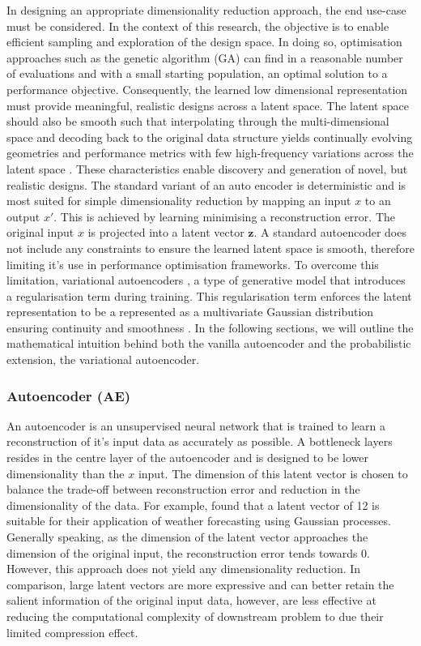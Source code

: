 \documentclass{article}
\begin{document}
In designing an appropriate dimensionality reduction approach, the end use-case must be considered. In the context of this research, the objective is to enable efficient sampling and exploration of the design space. In doing so, optimisation approaches such as the genetic algorithm (GA) can find in a reasonable number of evaluations and with a small starting population, an optimal solution to a performance objective. Consequently, the learned low dimensional representation must provide meaningful, realistic designs across a latent space. The latent space should also be smooth such that interpolating through the multi-dimensional space and decoding back to the original data structure yields continually evolving geometries and performance metrics with few high-frequency variations across the latent space \citep{Danhaive2022}. These characteristics enable discovery and generation of novel, but realistic designs. The standard variant of an auto encoder is deterministic and is most suited for simple dimensionality reduction by mapping an input $x$ to an output $x'$. This is achieved by learning minimising a reconstruction error. The original input $x$ is projected into a latent vector $\textbf{z}$. A standard autoencoder does not include any constraints to ensure the learned latent space is smooth, therefore limiting it's use in performance optimisation frameworks. To overcome this limitation, variational autoencoders \citep{Kingma2013}, a type of generative model \citep{Danhaive2022} that introduces a regularisation term during training. This regularisation term enforces the latent representation to be a represented as a multivariate Gaussian distribution ensuring continuity and smoothness \citep{Huang2022}. In the following sections, we will outline the mathematical intuition behind both the vanilla autoencoder and the probabilistic extension, the variational autoencoder.

\subsubsection{Autoencoder (AE)}
An autoencoder is an unsupervised neural network that is trained to learn a reconstruction of it's input data as accurately as possible. A bottleneck layers resides in the centre layer of the autoencoder and is designed to be lower dimensionality than the $x$ input. The dimension of this latent vector is chosen to balance the trade-off between reconstruction error and reduction in the dimensionality of the data. For example, \cite{Donnelly2024} found that a latent vector of 12 is suitable for their application of weather forecasting using Gaussian processes. Generally speaking, as the dimension of the latent vector approaches the dimension of the original input, the reconstruction error tends towards 0. However, this approach does not yield any dimensionality reduction. In comparison, large latent vectors are more expressive and can better retain the salient information of the original input data, however, are less effective at reducing the computational complexity of downstream problem to due their limited compression effect.
\end{document}
